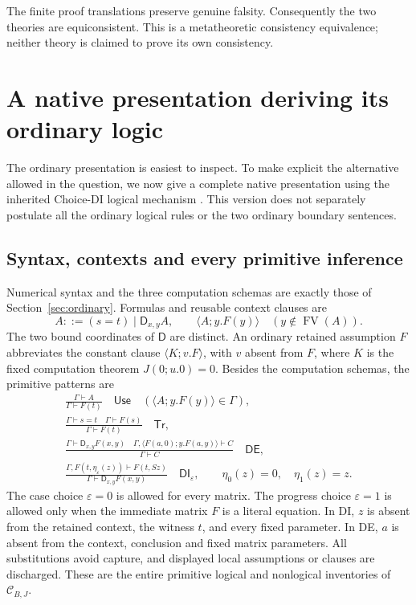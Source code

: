 \documentclass[11pt]{article}
\theoremstyle{definition}
\newcommand{\CB}{\mathcal C_{B,J}}
\newcommand{\FV}{\operatorname{FV}}
\newcommand{\D}{\mathsf D}
\newcommand{\seq}{\vdash}
\begin{document}
The finite proof translations preserve genuine falsity. Consequently the
two theories are equiconsistent. This is a metatheoretic consistency
equivalence; neither theory is claimed to prove its own consistency.

\section{A native presentation deriving its ordinary logic}
\label{sec:native}

The ordinary presentation is easiest to inspect. To make explicit the
alternative allowed in the question, we now give a complete native
presentation using the inherited Choice-DI logical mechanism
\cite{choice}. This version does not separately postulate all the
ordinary logical rules or the two ordinary boundary sentences.

\subsection{Syntax, contexts and every primitive inference}

Numerical syntax and the three computation schemas are exactly those
of Section~\ref{sec:ordinary}. Formulas and reusable context clauses are
\[
 A::=(s=t)\mid\D_{x,y}A,\qquad
 \langle A;y.F(y)\rangle\quad(y\notin\FV(A)).
\]
The two bound coordinates of $\D$ are distinct. An ordinary retained
assumption $F$ abbreviates the constant clause
$\langle K;v.F\rangle$, with $v$ absent from $F$, where
$K$ is the fixed computation theorem $J(0;u.0)=0$.
Besides the computation schemas, the primitive patterns are
\begin{gather*}
 \frac{\Gamma\seq A}{\Gamma\seq F(t)}
 \quad\mathsf{Use}\quad
 (\langle A;y.F(y)\rangle\in\Gamma),\\[4pt]
 \frac{\Gamma\seq s=t\quad\Gamma\seq F(s)}{\Gamma\seq F(t)}
 \quad\mathsf{Tr},\\[4pt]
 \frac{\Gamma\seq\D_{x,y}F(x,y)\quad
       \Gamma,\langle F(a,0);y.F(a,y)\rangle\seq C}
      {\Gamma\seq C}
 \quad\mathsf{DE},\\[4pt]
 \frac{\Gamma,F(t,\eta_\varepsilon(z))\seq F(t,Sz)}
      {\Gamma\seq\D_{x,y}F(x,y)}
 \quad\mathsf{DI}_\varepsilon,
 \qquad \eta_0(z)=0,\quad\eta_1(z)=z.
\end{gather*}
The case choice $\varepsilon=0$ is allowed for every matrix. The
progress choice $\varepsilon=1$ is allowed only when the immediate
matrix $F$ is a literal equation. In DI, $z$ is absent from the retained
context, the witness $t$, and every fixed parameter. In DE, $a$ is
absent from the context, conclusion and fixed matrix parameters. All
substitutions avoid capture, and displayed local assumptions or clauses
are discharged. These are the entire primitive logical and nonlogical
inventories of $\CB$.
\end{document}
